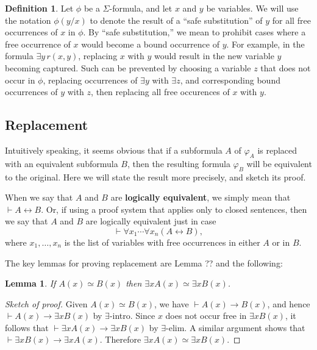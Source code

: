 \documentclass[11pt,fleqn]{article}
\newtheorem{lemma}[prop]{Lemma}
\theoremstyle{definition}
\newtheorem*{defn}{Definition}
\theoremstyle{remark}
\newcommand{\2}{\mathscr}
\newcommand{\vp}{\varphi}
\begin{document}

  \begin{defn} Let $\phi$ be a $\Sigma$-formula, and let $x$ and $y$ be
  variables.  We will use the notation $\phi (y/x)$ to denote the
  result of a ``safe substitution'' of $y$ for all free occurrences of
  $x$ in $\phi$.  By ``safe substitution,'' we mean to prohibit cases
  where a free occurrence of $x$ would become a bound occurrence of
  $y$.  For example, in the formula $\exists y\, r(x,y)$, replacing
  $x$ with $y$ would result in the new variable $y$ becoming captured.
  Such can be prevented by choosing a variable $z$ that does not occur
  in $\phi$, replacing occurrences of $\exists y$ with $\exists z$,
  and corresponding bound occurrences of $y$ with $z$, then replacing
  all free occurences of $x$ with $y$.
\end{defn}




\subsection*{Replacement}

Intuitively speaking, it seems obvious that if a subformula $A$ of
$\vp _A$ is replaced with an equivalent subformula $B$, then the
resulting formula $\vp _B$ will be equivalent to the original.  Here
we will state the result more precisely, and sketch its proof.

When we say that $A$ and $B$ are \textbf{logically equivalent}, we
simply mean that $\vdash A\leftrightarrow B$.  Or, if using a proof
system that applies only to closed sentences, then we say that $A$ and
$B$ are logically equivalent just in case
\[ \vdash \forall x_1\cdots \forall x_n(A\leftrightarrow B) , \] where
$x_1,\dots ,x_n$ is the list of variables with free occurrences in
either $A$ or in $B$.  

The key lemmas for proving replacement are Lemma ?? and the following:

\begin{lemma} If $A(x)\simeq B(x)$ then
  $\exists xA(x)\simeq \exists xB(x)$. \end{lemma}

\begin{proof}[Sketch of proof] Given $A(x)\simeq B(x)$, we have
  $\vdash A(x)\to B(x)$, and hence $\vdash A(x)\to \exists xB(x)$ by
  $\exists$-intro.  Since $x$ does not occur free in $\exists x B(x)$,
  it follows that $\vdash \exists xA(x)\to \exists xB(x)$ by
  $\exists$-elim.  A similar argument shows that
  $\vdash \exists x B(x) \to \exists x A(x)$.  Therefore
  $\exists x A(x)\simeq \exists x B(x)$. \end{proof}
  
\end{document}
